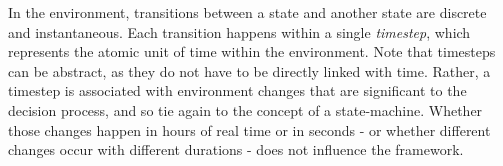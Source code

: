 
In the environment, transitions between a state and another state are discrete and instantaneous.
Each transition happens within a single \textit{timestep}, which represents the atomic unit of time
within the environment. Note that timesteps can be abstract, as they do not have to be directly
linked with time. Rather, a timestep is associated with environment changes that are significant to
the decision process, and so tie again to the concept of a state-machine. Whether those changes
happen in hours of real time or in seconds - or whether different changes occur with different
durations - does not influence the framework.

%

